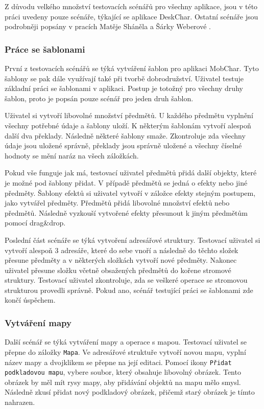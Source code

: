 \documentclass[thesis=B,czech]{resources/FITthesis}[2012/06/26]
\begin{document}
Z důvodu velkého množství testovacích scénářů pro všechny aplikace, jsou v této práci uvedeny pouze scénáře, týkající se aplikace DeskChar. Ostatní scénáře jsou podrobněji popsány v pracích Matěje Sháněla \cite{Shanel_2017} a Šárky Weberové \cite{Weberova_2017}. 

\subsubsection{Práce se šablonami}
První z testovacích scénářů se týká vytváření šablon pro aplikaci MobChar. Tyto šablony se pak dále využívají také při tvorbě dobrodružství. Uživatel testuje základní práci se šablonami v aplikaci. Postup je totožný pro všechny druhy šablon, proto je popsán pouze scénář pro jeden druh šablon. \par

Uživatel si vytvoří libovolné množství předmětů. U každého předmětu vyplnění všechny potřebné údaje a šablony uloží. K některým šablonám vytvoří alespoň další dva překlady. Následně některé šablony smaže. Zkontroluje zda všechny údaje jsou uložené správně, překlady jsou správně uložené a všechny číselné hodnoty se mění naráz na všech záložkách. \par

Pokud vše funguje jak má, testovací uživatel předmětů přidá další objekty, které je možné pod šablony přidat. V případě předmětů se jedná o efekty nebo jiné předměty. Šablony efektů si uživatel vytvoří v záložce efekty stejným postupem, jako vytvářel předměty. Předmětů přidá libovolné množství efektů nebo předmětů. Následně vyzkouší vytvořené efekty přesunout k jiným předmětům pomocí drag\&drop. \par 

Poslední část scénáře se týká vytvoření adresářové struktury. Testovací uživatel si vytvoří alespoň 3 adresáře, které do sebe vnoří a následně do těchto složek přesune předměty a v některých složkách vytvoří nové předměty. Nakonec uživatel přesune složku včetně obsažených předmětů do kořene stromové struktury. Testovací uživatel zkontroluje, zda se veškeré operace se stromovou strukturou provedli správně. Pokud ano, scénář testující práci se šablonami zde končí úspěchem. 

\subsubsection{Vytváření mapy}
Další scénář se týká vytváření mapy a operace s mapou.  Testovací uživatel se přepne do záložky \texttt{Mapa}. Ve adresářové struktuře vytvoří novou mapu, vyplní název mapy a dvojklikem se přepne na její editaci. Pomocí ikony \texttt{Přidat podkladovou mapu}, vybere soubor, který obsahuje libovolný obrázek. Tento obrázek by měl mít rysy mapy, aby přidávání objektů na mapu mělo smysl. Následně zkusí přidat nový podkladový obrázek, přičemž starý obrázek je tímto nahrazen. \par
\end{document}
